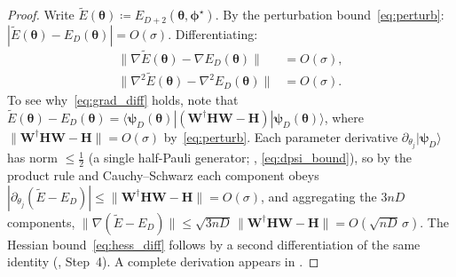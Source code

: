 \documentclass[11pt]{article}
\theoremstyle{plain}
\theoremstyle{plain}
\begin{document}
\begin{proof}
Write $\widetilde{E}(\bm\theta)\coloneqq
E_{D+2}(\bm\theta,\bm\phi^\star)$.
By the perturbation bound~\eqref{eq:perturb}:
$|\widetilde{E}(\bm\theta)-E_D(\bm\theta)|=O(\sigma)$.
Differentiating:
\begin{align}
  \|\nabla\widetilde{E}(\bm\theta)
  -\nabla E_D(\bm\theta)\|
  &=O(\sigma),\label{eq:grad_diff}\\
  \|\nabla^2\widetilde{E}(\bm\theta)
  -\nabla^2 E_D(\bm\theta)\|
  &=O(\sigma).\label{eq:hess_diff}
\end{align}
To see why~\eqref{eq:grad_diff} holds, note that
$\widetilde{E}(\bm\theta) - E_D(\bm\theta)
= \langle\boldsymbol{\psi}_D(\bm\theta)|(\mathbf{W}^\dagger \mathbf{H} \mathbf{W} - \mathbf{H})|\boldsymbol{\psi}_D(\bm\theta)
\rangle$,
where $\|\mathbf{W}^\dagger \mathbf{H} \mathbf{W} - \mathbf{H}\| = O(\sigma)$
by~\eqref{eq:perturb}.  Each parameter derivative
$\partial_{\theta_j}|\boldsymbol{\psi}_D\rangle$ has norm $\le\tfrac12$ (a
single half-Pauli generator; , \eqref{eq:dpsi_bound}),
so by the product rule and Cauchy--Schwarz each component obeys
$|\partial_{\theta_j}(\widetilde{E} - E_D)|\le\|\mathbf{W}^\dagger \mathbf{H} \mathbf{W} - \mathbf{H}\|
= O(\sigma)$, and aggregating the $3nD$ components,
$\|\nabla(\widetilde{E} - E_D)\| \le \sqrt{3nD}\,\|\mathbf{W}^\dagger \mathbf{H} \mathbf{W} - \mathbf{H}\|
= O(\sqrt{nD}\,\sigma)$.  The Hessian bound~\eqref{eq:hess_diff}
follows by a second differentiation of the same identity
(, Step~4).
A complete derivation appears in .


\end{proof}
\end{document}
